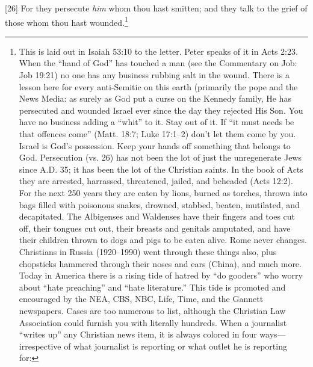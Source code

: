[26] \textcolor[rgb]{0.00,0.00,1.00}{For they persecute \emph{him} whom thou hast smitten; and they talk to the grief of those whom thou hast wounded.}\footnote{This is laid out in Isaiah 53:10 to the letter. Peter speaks of it in Acts 2:23. When the “hand of God” has touched a man (see the Commentary on Job: Job 19:21) no one has any business rubbing salt in the wound. There is a lesson here for every anti-Semitic on this earth (primarily the pope and the News Media: as surely as God put a curse on the Kennedy family, He has persecuted and wounded Israel ever since the day they rejected His Son. You have no business adding a “whit” to it. Stay out of it. If “it must needs be that offences come” (Matt. 18:7; Luke 17:1–2) don’t let them come by you. Israel is God’s possession. Keep your hands off something that belongs to God. Persecution (vs. 26) has not been the lot of just the unregenerate Jews since A.D. 35; it has been the lot of the Christian saints. In the book of Acts they are arrested, harrassed, threatened, jailed, and beheaded (Acts 12:2). For the next 250 years they are eaten by lions, burned as torches, thrown into bags filled with poisonous snakes, drowned, stabbed, beaten, mutilated, and decapitated. The Albigenses and Waldenses have their fingers and toes cut off, their tongues cut out, their breasts and genitals amputated, and have their children thrown to dogs and pigs to be eaten alive. Rome never changes. Christians in Russia (1920--1990) went through these things also, plus chopsticks hammered through their noses and ears (China), and much more. Today in America there is a rising tide of hatred by “do gooders” who worry about “hate preaching” and “hate literature.” This tide is promoted and encouraged by the NEA, CBS, NBC, Life, Time, and the Gannett newspapers. Cases are too numerous to list, although the Christian Law Association could furnish you with literally hundreds. When a journalist “writes up” any Christian news item, it is always colored in four ways—irrespective of what journalist is reporting or what outlet he is reporting for: 
}
